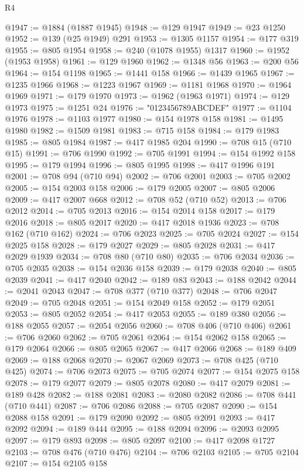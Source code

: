\begin{lexlean}{R4}
\begin{coremodule}
@1947 := @1884 (@1887 @1945)
@1948 := @129 @1947
@1949 := @23 @1250
@1952 := @139 (@25 @1949) @291
@1953 := @1305 @1157
@1954 := @177 @319
@1955 := @805 @1954
@1958 := @240 (@1078 @1955) @1317
@1960 := @1952 (@1953 @1958)
@1961 := @129 @1960
@1962 := @1348 @56
@1963 := @200 @56
@1964 := @154 @1198
@1965 := @1441 @158
@1966 := @1439 @1965
@1967 := @1235 @1966
@1968 := @1223 @1967
@1969 := @1181 @1968
@1970 := @1964 @1969
@1971 := @179 @1970
@1973 := @1962 (@1963 @1971)
@1974 := @129 @1973
@1975 := @1251 @24
@1976 := "0123456789ABCDEF"
@1977 := @1104 @1976
@1978 := @1103 @1977
@1980 := @154 @1978 @158
@1981 := @1495 @1980
@1982 := @1509 @1981
@1983 := @715 @158
@1984 := @179 @1983
@1985 := @805 @1984
@1987 := @417 @1985 @204
@1990 := @708 @15 (@710 @15)
@1991 := @706 @1990
@1992 := @705 @1991
@1994 := @154 @1992 @158
@1995 := @179 @1994
@1996 := @805 @1995
@1998 := @417 @1996 @191
@2001 := @708 @94 (@710 @94)
@2002 := @706 @2001
@2003 := @705 @2002
@2005 := @154 @2003 @158
@2006 := @179 @2005
@2007 := @805 @2006
@2009 := @417 @2007 @668
@2012 := @708 @52 (@710 @52)
@2013 := @706 @2012
@2014 := @705 @2013
@2016 := @154 @2014 @158
@2017 := @179 @2016
@2018 := @805 @2017
@2020 := @417 @2018 @1936
@2023 := @708 @162 (@710 @162)
@2024 := @706 @2023
@2025 := @705 @2024
@2027 := @154 @2025 @158
@2028 := @179 @2027
@2029 := @805 @2028
@2031 := @417 @2029 @1939
@2034 := @708 @80 (@710 @80)
@2035 := @706 @2034
@2036 := @705 @2035
@2038 := @154 @2036 @158
@2039 := @179 @2038
@2040 := @805 @2039
@2041 := @417 @2040
@2042 := @189 @83
@2043 := @188 @2042
@2044 := @2041 @2043
@2047 := @708 @377 (@710 @377)
@2048 := @706 @2047
@2049 := @705 @2048
@2051 := @154 @2049 @158
@2052 := @179 @2051
@2053 := @805 @2052
@2054 := @417 @2053
@2055 := @189 @380
@2056 := @188 @2055
@2057 := @2054 @2056
@2060 := @708 @406 (@710 @406)
@2061 := @706 @2060
@2062 := @705 @2061
@2064 := @154 @2062 @158
@2065 := @179 @2064
@2066 := @805 @2065
@2067 := @417 @2066
@2068 := @189 @409
@2069 := @188 @2068
@2070 := @2067 @2069
@2073 := @708 @425 (@710 @425)
@2074 := @706 @2073
@2075 := @705 @2074
@2077 := @154 @2075 @158
@2078 := @179 @2077
@2079 := @805 @2078
@2080 := @417 @2079
@2081 := @189 @428
@2082 := @188 @2081
@2083 := @2080 @2082
@2086 := @708 @441 (@710 @441)
@2087 := @706 @2086
@2088 := @705 @2087
@2090 := @154 @2088 @158
@2091 := @179 @2090
@2092 := @805 @2091
@2093 := @417 @2092
@2094 := @189 @444
@2095 := @188 @2094
@2096 := @2093 @2095
@2097 := @179 @893
@2098 := @805 @2097
@2100 := @417 @2098 @1727
@2103 := @708 @476 (@710 @476)
@2104 := @706 @2103
@2105 := @705 @2104
@2107 := @154 @2105 @158

\end{coremodule}
\end{lexlean}
